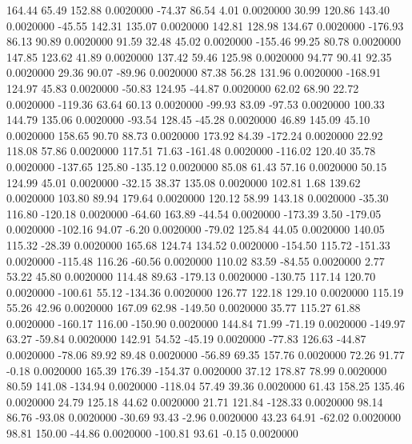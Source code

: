   164.44   65.49  152.88   0.0020000
  -74.37   86.54    4.01   0.0020000
   30.99  120.86  143.40   0.0020000
  -45.55  142.31  135.07   0.0020000
  142.81  128.98  134.67   0.0020000
 -176.93   86.13   90.89   0.0020000
   91.59   32.48   45.02   0.0020000
 -155.46   99.25   80.78   0.0020000
  147.85  123.62   41.89   0.0020000
  137.42   59.46  125.98   0.0020000
   94.77   90.41   92.35   0.0020000
   29.36   90.07  -89.96   0.0020000
   87.38   56.28  131.96   0.0020000
 -168.91  124.97   45.83   0.0020000
  -50.83  124.95  -44.87   0.0020000
   62.02   68.90   22.72   0.0020000
 -119.36   63.64   60.13   0.0020000
  -99.93   83.09  -97.53   0.0020000
  100.33  144.79  135.06   0.0020000
  -93.54  128.45  -45.28   0.0020000
   46.89  145.09   45.10   0.0020000
  158.65   90.70   88.73   0.0020000
  173.92   84.39 -172.24   0.0020000
   22.92  118.08   57.86   0.0020000
  117.51   71.63 -161.48   0.0020000
 -116.02  120.40   35.78   0.0020000
 -137.65  125.80 -135.12   0.0020000
   85.08   61.43   57.16   0.0020000
   50.15  124.99   45.01   0.0020000
  -32.15   38.37  135.08   0.0020000
  102.81    1.68  139.62   0.0020000
  103.80   89.94  179.64   0.0020000
  120.12   58.99  143.18   0.0020000
  -35.30  116.80 -120.18   0.0020000
  -64.60  163.89  -44.54   0.0020000
 -173.39    3.50 -179.05   0.0020000
 -102.16   94.07   -6.20   0.0020000
  -79.02  125.84   44.05   0.0020000
  140.05  115.32  -28.39   0.0020000
  165.68  124.74  134.52   0.0020000
 -154.50  115.72 -151.33   0.0020000
 -115.48  116.26  -60.56   0.0020000
  110.02   83.59  -84.55   0.0020000
    2.77   53.22   45.80   0.0020000
  114.48   89.63 -179.13   0.0020000
 -130.75  117.14  120.70   0.0020000
 -100.61   55.12 -134.36   0.0020000
  126.77  122.18  129.10   0.0020000
  115.19   55.26   42.96   0.0020000
  167.09   62.98 -149.50   0.0020000
   35.77  115.27   61.88   0.0020000
 -160.17  116.00 -150.90   0.0020000
  144.84   71.99  -71.19   0.0020000
 -149.97   63.27  -59.84   0.0020000
  142.91   54.52  -45.19   0.0020000
  -77.83  126.63  -44.87   0.0020000
  -78.06   89.92   89.48   0.0020000
  -56.89   69.35  157.76   0.0020000
   72.26   91.77   -0.18   0.0020000
  165.39  176.39 -154.37   0.0020000
   37.12  178.87   78.99   0.0020000
   80.59  141.08 -134.94   0.0020000
 -118.04   57.49   39.36   0.0020000
   61.43  158.25  135.46   0.0020000
   24.79  125.18   44.62   0.0020000
   21.71  121.84 -128.33   0.0020000
   98.14   86.76  -93.08   0.0020000
  -30.69   93.43   -2.96   0.0020000
   43.23   64.91  -62.02   0.0020000
   98.81  150.00  -44.86   0.0020000
 -100.81   93.61   -0.15   0.0020000
